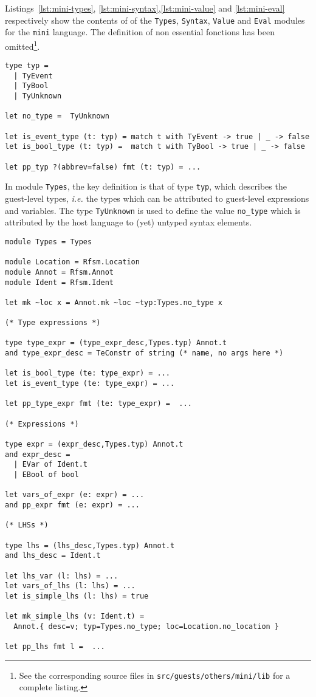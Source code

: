 Listings~\ref{lst:mini-types}, \ref{lst:mini-syntax},\ref{lst:mini-value} and \ref{lst:mini-eval}
respectively show the contents of of the \texttt{Types},
\texttt{Syntax}, \texttt{Value} and \texttt{Eval} modules for the \texttt{mini} language.
The definition of non essential fonctions has been omitted\footnote{See the corresponding source files in
  \texttt{src/guests/others/mini/lib} for a complete listing.}.

\begin{lstlisting}[language={[Objective]Caml},frame=single,basicstyle=\small,caption={Module
    \texttt{Guest.Types} (excerpt)},label={lst:mini-types}]
type typ =
  | TyEvent
  | TyBool
  | TyUnknown

let no_type =  TyUnknown

let is_event_type (t: typ) = match t with TyEvent -> true | _ -> false
let is_bool_type (t: typ) =  match t with TyBool -> true | _ -> false

let pp_typ ?(abbrev=false) fmt (t: typ) = ...
\end{lstlisting}

In module \texttt{Types}, the key definition is that of type \texttt{typ}, which describes the
guest-level types, \emph{i.e.} the types which can be attributed to guest-level expressions and
variables. The type \texttt{TyUnknown} is used to define the value \texttt{no_type} which is
attributed by the host language to (yet) untyped syntax elements.

\begin{lstlisting}[language={[Objective]Caml},frame=single,basicstyle=\small,caption={Module
    \texttt{Guest.Syntax} (excerpt)}, label={lst:mini-syntax}]
module Types = Types

module Location = Rfsm.Location
module Annot = Rfsm.Annot
module Ident = Rfsm.Ident

let mk ~loc x = Annot.mk ~loc ~typ:Types.no_type x

(* Type expressions *)

type type_expr = (type_expr_desc,Types.typ) Annot.t
and type_expr_desc = TeConstr of string (* name, no args here *)

let is_bool_type (te: type_expr) = ...
let is_event_type (te: type_expr) = ...

let pp_type_expr fmt (te: type_expr) =  ...

(* Expressions *)
  
type expr = (expr_desc,Types.typ) Annot.t
and expr_desc = 
  | EVar of Ident.t
  | EBool of bool

let vars_of_expr (e: expr) = ...
and pp_expr fmt (e: expr) = ...

(* LHSs *)
  
type lhs = (lhs_desc,Types.typ) Annot.t
and lhs_desc = Ident.t

let lhs_var (l: lhs) = ...
let vars_of_lhs (l: lhs) = ...
let is_simple_lhs (l: lhs) = true

let mk_simple_lhs (v: Ident.t) =
  Annot.{ desc=v; typ=Types.no_type; loc=Location.no_location }

let pp_lhs fmt l =  ...
\end{lstlisting}

